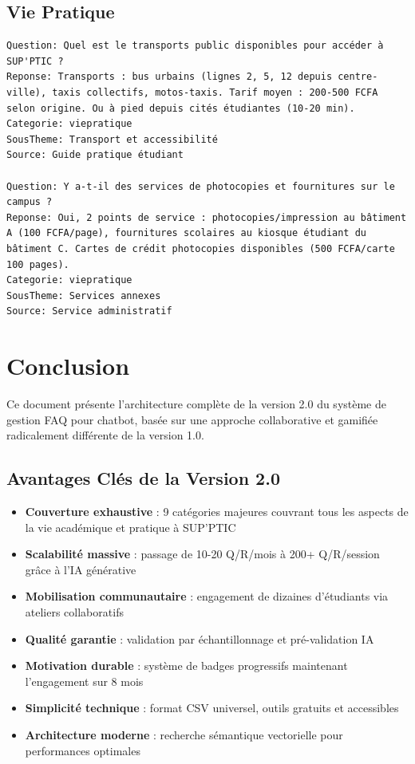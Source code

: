 \documentclass[11pt,a4paper]{article}
\begin{document}
\subsection{Vie Pratique}
\begin{lstlisting}
Question: Quel est le transports public disponibles pour accéder à SUP'PTIC ?
Reponse: Transports : bus urbains (lignes 2, 5, 12 depuis centre-ville), taxis collectifs, motos-taxis. Tarif moyen : 200-500 FCFA selon origine. Ou à pied depuis cités étudiantes (10-20 min).
Categorie: viepratique
SousTheme: Transport et accessibilité
Source: Guide pratique étudiant

Question: Y a-t-il des services de photocopies et fournitures sur le campus ?
Reponse: Oui, 2 points de service : photocopies/impression au bâtiment A (100 FCFA/page), fournitures scolaires au kiosque étudiant du bâtiment C. Cartes de crédit photocopies disponibles (500 FCFA/carte 100 pages).
Categorie: viepratique
SousTheme: Services annexes
Source: Service administratif
\end{lstlisting}

\clearpage

\section*{Conclusion}

Ce document présente l'architecture complète de la version 2.0 du système de gestion FAQ pour chatbot, basée sur une approche collaborative et gamifiée radicalement différente de la version 1.0.

\subsection*{Avantages Clés de la Version 2.0}

\begin{itemize}
    \item \textbf{Couverture exhaustive} : 9 catégories majeures couvrant tous les aspects de la vie académique et pratique à SUP'PTIC
    \item \textbf{Scalabilité massive} : passage de 10-20 Q/R/mois à 200+ Q/R/session grâce à l'IA générative
    \item \textbf{Mobilisation communautaire} : engagement de dizaines d'étudiants via ateliers collaboratifs
    \item \textbf{Qualité garantie} : validation par échantillonnage et pré-validation IA
    \item \textbf{Motivation durable} : système de badges progressifs maintenant l'engagement sur 8 mois
    \item \textbf{Simplicité technique} : format CSV universel, outils gratuits et accessibles
    \item \textbf{Architecture moderne} : recherche sémantique vectorielle pour performances optimales
\end{itemize}
\end{document}
